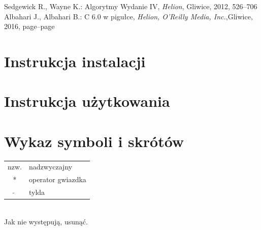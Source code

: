 \documentclass[a4paper,11pt,twoside]{report}
\theoremstyle{definition}
\begin{document}
\begin{thebibliography}{20}
 Sedgewick R., Wayne K.: Algorytmy Wydanie IV, \emph{Helion}, Gliwice, 2012, 526--706
 Albahari J., Albahari B.: C 6.0 w pigułce, \emph{Helion, O'Reilly Media, Inc.},Gliwice, 2016, page--page 
\end{thebibliography}





\chapter*{Instrukcja instalacji}





\chapter*{Instrukcja użytkowania}



\chapter*{Wykaz symboli i skrótów}


\begin{tabular}{cl}
nzw. & nadzwyczajny \\
* & operator gwiazdka \\
$\widetilde{}$ & tylda
\end{tabular}
\\
Jak nie występują, usunąć.


\end{document}
